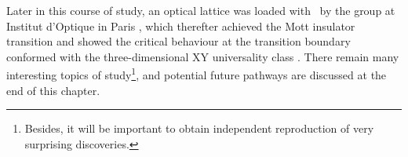 	Later in this course of study, an optical lattice was loaded with \mhe~by the group at Institut d'Optique in Paris \cite{Cayla18}, which therefter achieved the Mott insulator transition \cite{Carcy19} and showed the critical behaviour at the transition boundary conformed with the three-dimensional XY universality class \cite{Herce21}.
	 There remain many interesting topics of study\footnote{Besides, it will be important to obtain independent reproduction of very surprising discoveries.}, and potential future pathways are discussed at the end of this chapter.
	

	
	



